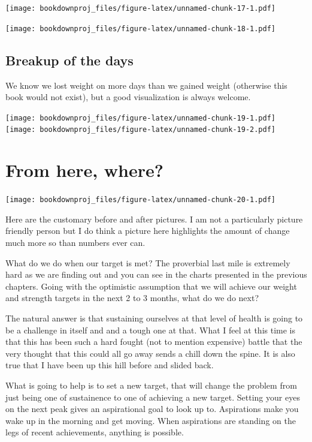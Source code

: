 \documentclass[
  oneside]{book}
\begin{document}
\texttt{[image: bookdownproj\_files/figure-latex/unnamed-chunk-17-1.pdf]}

\texttt{[image: bookdownproj\_files/figure-latex/unnamed-chunk-18-1.pdf]}

\hypertarget{breakup-of-the-days}{%
\section{Breakup of the days}\label{breakup-of-the-days}}

We know we lost weight on more days than we gained weight (otherwise this book would not exist), but a good visualization is always welcome.

\texttt{[image: bookdownproj\_files/figure-latex/unnamed-chunk-19-1.pdf]} \texttt{[image: bookdownproj\_files/figure-latex/unnamed-chunk-19-2.pdf]}

\hypertarget{from-here-where}{%
\chapter{From here, where?}\label{from-here-where}}

\texttt{[image: bookdownproj\_files/figure-latex/unnamed-chunk-20-1.pdf]}

Here are the customary before and after pictures. I am not a particularly picture friendly person but I do think a picture here highlights the amount of change much more so than numbers ever can.

What do we do when our target is met? The proverbial last mile is extremely hard as we are finding out and you can see in the charts presented in the previous chapters. Going with the optimistic assumption that we will achieve our weight and strength targets in the next 2 to 3 months, what do we do next?

The natural answer is that sustaining ourselves at that level of health is going to be a challenge in itself and and a tough one at that. What I feel at this time is that this has been such a hard fought (not to mention expensive) battle that the very thought that this could all go away sends a chill down the spine. It is also true that I have been up this hill before and slided back.

What is going to help is to set a new target, that will change the problem from just being one of sustainence to one of achieving a new target. Setting your eyes on the next peak gives an aspirational goal to look up to. Aspirations make you wake up in the morning and get moving. When aspirations are standing on the legs of recent achievements, anything is possible.
\end{document}
